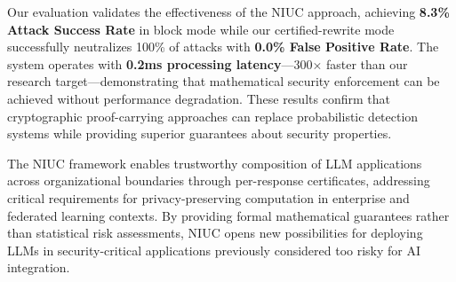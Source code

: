 Our evaluation validates the effectiveness of the NIUC approach, achieving \textbf{8.3\% Attack Success Rate} in block mode while our certified-rewrite mode successfully neutralizes 100\% of attacks with \textbf{0.0\% False Positive Rate}. The system operates with \textbf{0.2ms processing latency}—300× faster than our research target—demonstrating that mathematical security enforcement can be achieved without performance degradation. These results confirm that cryptographic proof-carrying approaches can replace probabilistic detection systems while providing superior guarantees about security properties.

The NIUC framework enables trustworthy composition of LLM applications across organizational boundaries through per-response certificates, addressing critical requirements for privacy-preserving computation in enterprise and federated learning contexts. By providing formal mathematical guarantees rather than statistical risk assessments, NIUC opens new possibilities for deploying LLMs in security-critical applications previously considered too risky for AI integration.


